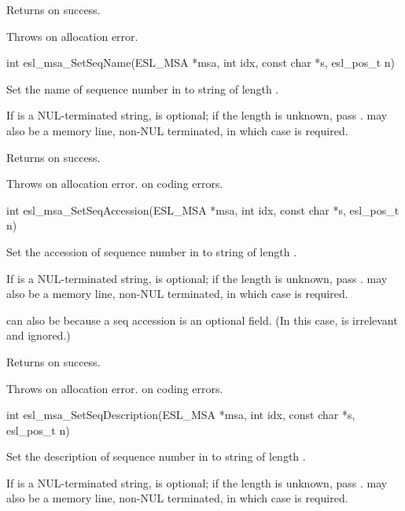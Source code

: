 \begin{sreapi}
Returns  on success.

Throws  on allocation error.


\hypertarget{func:esl_msa_SetSeqName()}
{\item[int esl\_msa\_SetSeqName(ESL\_MSA *msa, int idx, const char *s, esl\_pos\_t n)]}

Set the name of sequence number  in 
to string  of length .

If  is a NUL-terminated string,  is optional; if
the length is unknown, pass .  may also be a
memory line, non-NUL terminated, in which case  is
required.

Returns  on success.

Throws  on allocation error.
 on coding errors.



\hypertarget{func:esl_msa_SetSeqAccession()}
{\item[int esl\_msa\_SetSeqAccession(ESL\_MSA *msa, int idx, const char *s, esl\_pos\_t n)]}

Set the accession of sequence number  in  to
string  of length .

If  is a NUL-terminated string,  is optional; if
the length is unknown, pass .  may also be a
memory line, non-NUL terminated, in which case  is
required.

 can also be  because a seq accession is an
optional field. (In this case,  is irrelevant and
ignored.)

Returns  on success.

Throws  on allocation error.
 on coding errors.


\hypertarget{func:esl_msa_SetSeqDescription()}
{\item[int esl\_msa\_SetSeqDescription(ESL\_MSA *msa, int idx, const char *s, esl\_pos\_t n)]}

Set the description of sequence number  in  to
string  of length .

If  is a NUL-terminated string,  is optional; if
the length is unknown, pass .  may also be a
memory line, non-NUL terminated, in which case  is
required.


\end{sreapi}
